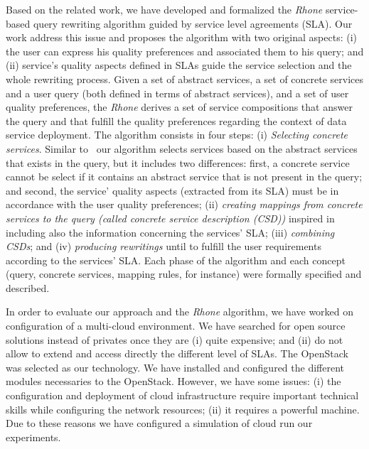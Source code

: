 \documentclass[11pt,a4paper,oneside]{report}
\begin{document}
Based on the related work, we have developed and formalized the \textit{Rhone} service-based query rewriting algorithm guided by service level agreements (SLA). Our work address this issue and proposes the algorithm with two original aspects: (i) the user can express his quality preferences and associated them to his query; and (ii) service’s quality aspects defined in SLAs guide the service selection and the whole rewriting process.  Given a set of abstract services, a set of concrete services and a user query (both defined in terms of abstract services), and a set of user quality preferences, the \textit{Rhone} derives a set of service compositions that answer the query and that fulfill the quality preferences regarding the context of data service deployment. The algorithm consists in four steps: (i) \textit{Selecting concrete services}. Similar to~\cite{Levy:1996,Pottinger:2001} our algorithm selects services based on the abstract services that exists in the query, but it includes two differences: first, a concrete service cannot be select if it contains an abstract service that is not present in the query; and second, the service' quality aspects (extracted from its SLA) must be in accordance with the user quality preferences; (ii) \textit{creating mappings from concrete services to the query (called concrete service description (CSD))} inspired in~\cite{Pottinger:2001} including also the information concerning the services' SLA; (iii) \textit{combining CSDs}; and (iv) \textit{producing rewritings} until to fulfill the user requirements according to the services' SLA. Each phase of the algorithm and each concept (query, concrete services, mapping rules, for instance) were formally specified and described.


In order to evaluate our approach and the \textit{Rhone} algorithm, we have worked on configuration of a multi-cloud environment. We have searched for open source solutions instead of privates once they are (i) quite expensive; and (ii) do not allow to extend and access directly the different level of SLAs. The OpenStack was selected as our technology. We have installed and configured the different modules necessaries to the OpenStack. However, we have some issues: (i) the configuration and deployment of cloud infrastructure require important technical skills while configuring the network resources; (ii) it requires a powerful machine. Due to these reasons we have configured a simulation of cloud run our experiments.
\end{document}
